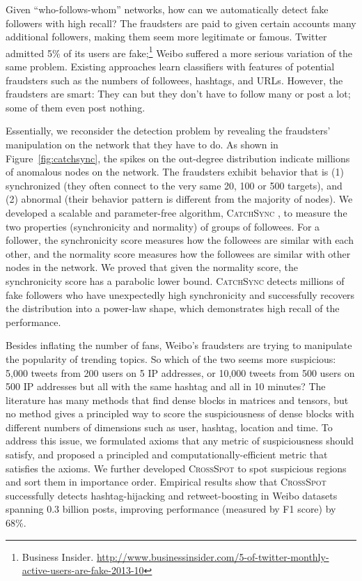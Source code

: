 \documentclass[10.5pt]{article}
\begin{document}
Given ``who-follows-whom'' networks, how can we automatically detect fake followers with high recall? The fraudsters are paid to given certain accounts many additional followers, making them seem more legitimate or famous. Twitter admitted 5\% of its users are fake;\footnote{Business Insider. \url{http://www.businessinsider.com/5-of-twitter-monthly-active-users-are-fake-2013-10}} Weibo suffered a more serious variation of the same problem. Existing approaches learn classifiers with features of potential fraudsters such as the numbers of followees, hashtags, and URLs. However, the fraudsters are smart: They can but they don't have to follow many or post a lot; some of them even post nothing.

Essentially, we reconsider the detection problem by revealing the fraudsters' manipulation on the network that they have to do. As shown in Figure~\ref{fig:catchsync}, the spikes on the out-degree distribution indicate millions of anomalous nodes on the network. The fraudsters exhibit behavior that is (1) synchronized (they often connect to the very same 20, 100 or 500 targets), and (2) abnormal (their behavior pattern is different from the majority of nodes). We developed a scalable and parameter-free algorithm, \textsc{CatchSync} \cite{jiang2014catchsync}, to measure the two properties (synchronicity and normality) of groups of followees. For a follower, the synchronicity score measures how the followees are similar with each other, and the normality score measures how the followees are similar with other nodes in the network. We proved that given the normality score, the synchronicity score has a parabolic lower bound. \textsc{CatchSync} detects millions of fake followers who have unexpectedly high synchronicity and successfully recovers the distribution into a power-law shape, which demonstrates high recall of the performance.

 Besides inflating the number of fans, Weibo's fraudsters are trying to manipulate the popularity of trending topics. So which of the two seems more suspicious: 5,000 tweets from 200 users on 5 IP addresses, or 10,000 tweets from 500 users on 500 IP addresses but all with the same hashtag and all in 10 minutes? The literature has many methods that find dense blocks in matrices and tensors, but no method gives a principled way to score the suspiciousness of dense blocks with different numbers of dimensions such as user, hashtag, location and time. To address this issue, we formulated axioms that any metric of suspiciousness should satisfy, and proposed a principled and computationally-efficient metric that satisfies the axioms. We further developed \textsc{CrossSpot} \cite{jiang2015general} to spot suspicious regions and sort them in importance order. Empirical results show that \textsc{CrossSpot} successfully detects hashtag-hijacking and retweet-boosting in Weibo datasets spanning 0.3 billion posts, improving performance (measured by F1 score) by 68\%.
\end{document}
